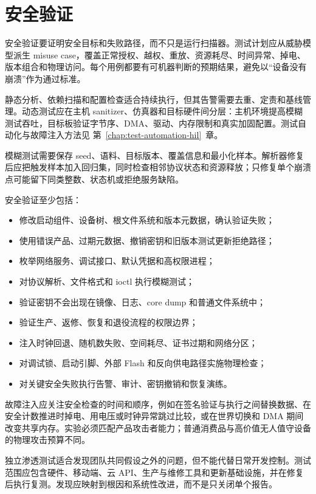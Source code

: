\section{安全验证}

安全验证要证明安全目标和失败路径，而不只是运行扫描器。测试计划应从威胁模型派生 misuse case，覆盖正常授权、越权、重放、资源耗尽、时间异常、掉电、版本组合和物理访问。每个用例都要有可机器判断的预期结果，避免以“设备没有崩溃”作为通过标准。

静态分析、依赖扫描和配置检查适合持续执行，但其告警需要去重、定责和基线管理。动态测试应在主机 sanitizer、仿真器和目标硬件间分层：主机环境提高模糊测试吞吐，目标板验证字节序、DMA、驱动、内存限制和真实加固配置。测试自动化与故障注入方法见 \mbox{第~\ref{chap:test-automation-hil}~章}。

模糊测试需要保存 seed、语料、目标版本、覆盖信息和最小化样本。解析器修复后应把触发样本加入回归集，同时检查相邻协议状态和资源释放；只修复单个崩溃点可能留下同类整数、状态机或拒绝服务缺陷。

安全验证至少包括：
\begin{itemize}
  \item 修改启动组件、设备树、根文件系统和版本元数据，确认验证失败；
  \item 使用错误产品、过期元数据、撤销密钥和旧版本测试更新拒绝路径；
  \item 枚举网络服务、调试接口、默认凭据和高权限进程；
  \item 对协议解析、文件格式和 ioctl 执行模糊测试；
  \item 验证密钥不会出现在镜像、日志、core dump 和普通文件系统中；
  \item 验证生产、返修、恢复和退役流程的权限边界；
  \item 注入时钟回退、随机数失败、空间耗尽、证书过期和网络分区；
  \item 对调试锁、启动引脚、外部 Flash 和反向供电路径实施物理检查；
  \item 对关键安全失败执行告警、审计、密钥撤销和恢复演练。
\end{itemize}

故障注入应关注安全检查的时间和顺序，例如在签名验证与执行之间替换数据、在安全计数推进时掉电、用电压或时钟异常跳过比较，或在世界切换和 DMA 期间改变共享内存。实验必须匹配产品攻击者能力；普通消费品与高价值无人值守设备的物理攻击预算不同。

独立渗透测试适合发现团队共同假设之外的问题，但不能代替日常开发控制。测试范围应包含硬件、移动端、云 API、生产与维修工具和更新基础设施，并在修复后执行复测。发现应映射到根因和系统性改进，而不是只关闭单个报告。

